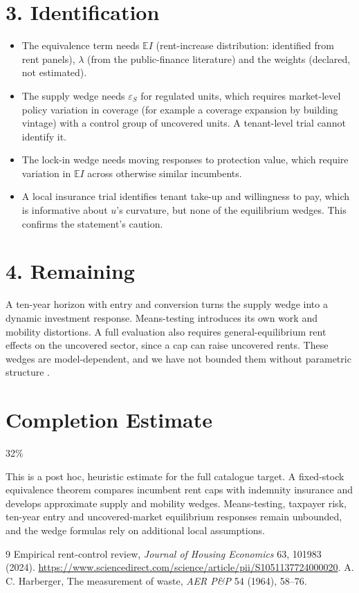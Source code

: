 \documentclass[11pt]{article}
\theoremstyle{definition}
\begin{document}
\section*{3. Identification}
\begin{itemize}
\item The equivalence term needs $\mathbb EI$ (rent-increase distribution: identified from rent panels), $\lambda$ (from
the public-finance literature) and the weights (declared, not estimated).
\item The supply wedge needs $\varepsilon_S$ for regulated units, which requires market-level policy variation in coverage
(for example a coverage expansion by building vintage) with a control group of uncovered units. A tenant-level trial cannot
identify it.
\item The lock-in wedge needs moving responses to protection value, which require variation in $\mathbb EI$ across otherwise
similar incumbents.
\item A local insurance trial identifies tenant take-up and willingness to pay, which is informative about $u$'s
curvature, but none of the equilibrium wedges. This confirms the statement's caution.
\end{itemize}

\section*{4. Remaining}
A ten-year horizon with entry and conversion turns the supply wedge into a dynamic investment response. Means-testing
introduces its own work and mobility distortions. A full evaluation also requires general-equilibrium rent effects on the
uncovered sector, since a cap can raise uncovered rents. These wedges are model-dependent, and we have not bounded them
without parametric structure \cite{jhe}.

\section{Completion Estimate}
32\%

This is a post hoc, heuristic estimate for the full catalogue target.
A fixed-stock equivalence theorem compares incumbent rent caps with indemnity insurance and develops approximate supply and mobility wedges. Means-testing, taxpayer risk, ten-year entry and uncovered-market equilibrium responses remain unbounded, and the wedge formulas rely on additional local assumptions.

\begin{thebibliography}{9}
 Empirical rent-control review, \emph{Journal of Housing Economics} 63, 101983 (2024). \url{https://www.sciencedirect.com/science/article/pii/S1051137724000020}.
 A. C. Harberger, The measurement of waste, \emph{AER P\&P} 54 (1964), 58--76.
\end{thebibliography}
\end{document}
